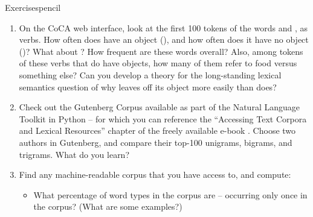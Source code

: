 \begin{tblsfilledsymbol}{Exercises}{pencil}
\begin{enumerate}
\begin{itemize}

\item  Find and interpret some corpus data to
support your claim.  

\item Next, imagine that you are a prosecutor, and you want to argue the opposite -- that the defendant actually \emph{did} harbor an undocumented immigrant.  Again, find and interpret some corpus data to support this claim.

\end{itemize}


\item  On the CoCA web interface, look at the first 100 tokens of the words 
and , as verbs.  How often does  have an
object (), and how often does it have no object
()?  What about ?  How frequent are these
words overall?  Also, among tokens of these verbs that do have
objects, how many of them refer to food versus something else?  Can
you develop a theory for the long-standing lexical semantics question
of why  leaves off its object more easily than
 does?

\item  Check out the Gutenberg Corpus available as part of
the Natural Language Toolkit in Python -- for which you can reference  the ``Accessing Text
Corpora and Lexical Resources'' chapter of the freely available
e-book  \citep{Bird-etal:2009}.  Choose two authors in Gutenberg,
and compare their top-100 unigrams, bigrams, and trigrams.  What do you learn?

\item  Find any machine-readable corpus that you have access to, and compute:

\begin{itemize}

\item What percentage of word types in the corpus are  -- occurring only once in the corpus?  (What are some examples?)


\end{itemize}
\end{enumerate}
\end{tblsfilledsymbol}
